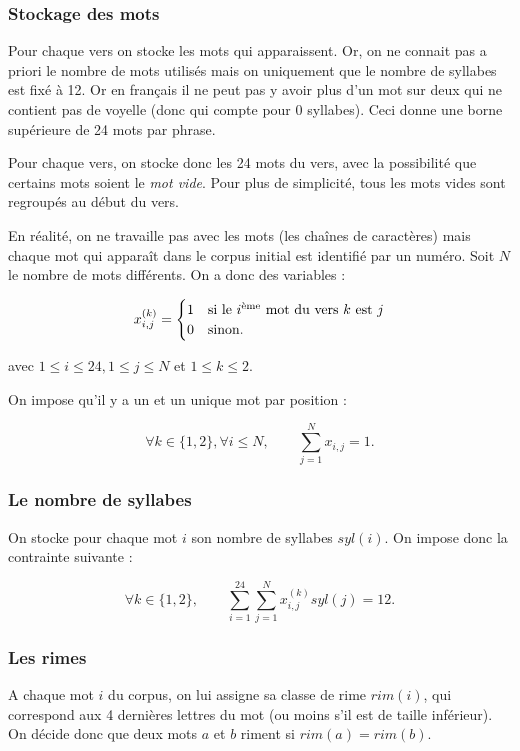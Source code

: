 \documentclass[a4paper,11pt]{article}
\begin{document}
\subsubsection{Stockage des mots}

Pour chaque vers on stocke les mots qui apparaissent. Or, on ne connait pas a priori le nombre de mots utilisés mais on uniquement que le nombre de syllabes est fixé à 12. Or en français il ne peut pas y avoir plus d'un mot sur deux qui ne contient pas de voyelle (donc qui compte pour 0 syllabes). Ceci donne une borne supérieure de 24 mots par phrase.

Pour chaque vers, on stocke donc les 24 mots du vers, avec la possibilité que certains mots soient le \textit{mot vide}. Pour plus de simplicité, tous les mots vides sont regroupés au début du vers.

En réalité, on ne travaille pas avec les mots (les chaînes de caractères) mais chaque mot qui apparaît dans le corpus initial est identifié par un numéro. Soit $N$ le nombre de mots différents. On a donc des variables :

\[x_{i,j}^{(k)} =
\begin{cases} 
1 & \mbox{si le } i \mbox{\textsuperscript{ème} mot du vers } k \mbox{ est } j \\ 
0 & \mbox{sinon.} 
\end{cases}
 \]

avec $1 \leq i \leq 24, 1 \leq j \leq N$ et $1 \leq k \leq 2$.

On impose qu'il y a un et un unique mot par position :

\[\forall k \in \{1,2\}, \forall i \leq N, \qquad \sum_{j=1}^{N} x_{i,j} = 1.\]

\subsubsection{Le nombre de syllabes}

On stocke pour chaque mot $i$ son nombre de syllabes $syl(i)$. On impose donc la contrainte suivante :

\[\forall k \in \{1,2\}, \qquad \sum_{i=1}^{24} \sum_{j=1}^{N} x_{i,j}^{(k)} syl(j) = 12.\]

\subsubsection{Les rimes}

A chaque mot $i$ du corpus, on lui assigne sa classe de rime $rim(i)$, qui correspond aux 4 dernières lettres du mot (ou moins s'il est de taille inférieur). On décide donc que deux mots $a$ et $b$ riment si $rim(a) = rim(b)$.
\end{document}
